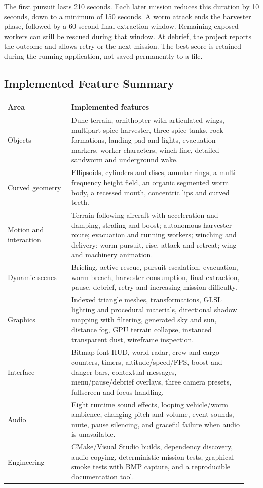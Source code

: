 The first pursuit lasts 210 seconds. Each later mission reduces this duration by 10 seconds, down to a minimum of 150 seconds. A worm attack ends the harvester phase, followed by a 60-second final extraction window. Remaining exposed workers can still be rescued during that window. At debrief, the project reports the outcome and allows retry or the next mission. The best score is retained during the running application, not saved permanently to a file.

\subsection{Implemented Feature Summary}
\begin{longtable}{L{0.25\linewidth}L{0.69\linewidth}}
\toprule\textbf{Area}&\textbf{Implemented features}\\\midrule\endhead
Objects & Dune terrain, ornithopter with articulated wings, multipart spice harvester, three spice tanks, rock formations, landing pad and lights, evacuation markers, worker characters, winch line, detailed sandworm and underground wake.\\
Curved geometry & Ellipsoids, cylinders and discs, annular rings, a multi-frequency height field, an organic segmented worm body, a recessed mouth, concentric lips and curved teeth.\\
Motion and interaction & Terrain-following aircraft with acceleration and damping, strafing and boost; autonomous harvester route; evacuation and running workers; winching and delivery; worm pursuit, rise, attack and retreat; wing and machinery animation.\\
Dynamic scenes & Briefing, active rescue, pursuit escalation, evacuation, worm breach, harvester consumption, final extraction, pause, debrief, retry and increasing mission difficulty.\\
Graphics & Indexed triangle meshes, transformations, GLSL lighting and procedural materials, directional shadow mapping with filtering, generated sky and sun, distance fog, GPU terrain collapse, instanced transparent dust, wireframe inspection.\\
Interface & Bitmap-font HUD, world radar, crew and cargo counters, timers, altitude/speed/FPS, boost and danger bars, contextual messages, menu/pause/debrief overlays, three camera presets, fullscreen and focus handling.\\
Audio & Eight runtime sound effects, looping vehicle/worm ambience, changing pitch and volume, event sounds, mute, pause silencing, and graceful failure when audio is unavailable.\\
Engineering & CMake/Visual Studio builds, dependency discovery, audio copying, deterministic mission tests, graphical smoke tests with BMP capture, and a reproducible documentation tool.\\
\bottomrule
\end{longtable}

